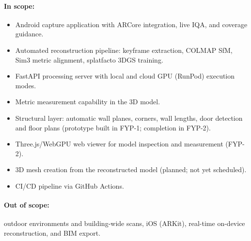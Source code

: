 \paragraph{In scope:}
\begin{itemize}
    \item Android capture application with ARCore integration, live IQA, and coverage guidance.
    \item Automated reconstruction pipeline: keyframe extraction, COLMAP SfM, Sim3 metric alignment, splatfacto 3DGS training.
    \item FastAPI processing server with local and cloud GPU (RunPod) execution modes.
    \item Metric measurement capability in the 3D model.
    \item Structural layer: automatic wall planes, corners, wall lengths, door detection and floor plans (prototype built in FYP-1; completion in FYP-2).
    \item Three.js/WebGPU web viewer for model inspection and measurement (FYP-2).
    \item 3D mesh creation from the reconstructed model (planned; not yet scheduled).
    \item CI/CD pipeline via GitHub Actions.
\end{itemize}

\paragraph{Out of scope:} outdoor environments and building-wide scans, iOS (ARKit), real-time on-device reconstruction, and BIM export.

